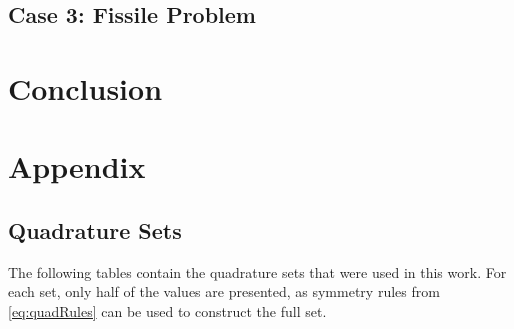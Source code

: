 \documentclass{article}
\begin{document}
\subsection{Case 3: Fissile Problem} \label{sec:fissile}

\section{Conclusion} 

\section{Appendix}

\subsection{Quadrature Sets} \label{sec:qsets}
The following tables contain the quadrature sets that were used in this work.
For each set, only half of the values are presented, as symmetry rules from \cref{eq:quadRules}
can be used to construct the full set.



\end{document}
